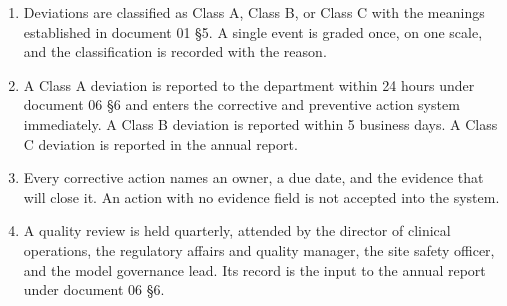 \begin{enumerate}
\item Deviations are classified as Class A, Class B, or Class C with the
  meanings established in document 01 §5. A single event is graded once, on one
  scale, and the classification is recorded with the reason.

\item A Class A deviation is reported to the department within 24 hours under
  document 06 §6 and enters the corrective and preventive action system
  immediately. A Class B deviation is reported within 5 business days. A Class C
  deviation is reported in the annual report.

\item Every corrective action names an owner, a due date, and the evidence that
  will close it. An action with no evidence field is not accepted into the
  system.

\item A quality review is held quarterly, attended by the director of clinical
  operations, the regulatory affairs and quality manager, the site safety
  officer, and the model governance lead. Its record is the input to the annual
  report under document 06 §6.
\end{enumerate}
